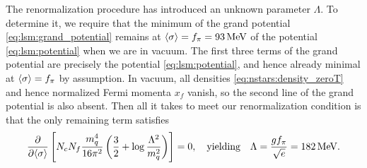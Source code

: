 The renormalization procedure has introduced an unknown parameter $\Lambda$.
To determine it, we require that the minimum of the grand potential \eqref{eq:lsm:grand_potential} remains at $\langle \sigma \rangle = f_\pi = \SI{93}{\mega\electronvolt}$ of the potential \eqref{eq:lsm:potential} when we are in vacuum.
The first three terms of the grand potential are precisely the potential \eqref{eq:lsm:potential}, and hence already minimal at $\langle \sigma \rangle = f_\pi$ by assumption.
In vacuum, all densities \eqref{eq:nstars:density_zeroT} and hence normalized Fermi momenta $x_f$ vanish, so the second line of the grand potential is also absent.
Then all it takes to meet our renormalization condition is that the only remaining term satisfies
\begin{equation}
	\pdv*{\left[ N_c N_f \frac{m_q^4}{16 \pi^2} \left( \frac32 + \log \frac{\Lambda^2}{m_q^2} \right) \right] }{\langle \sigma \rangle} = 0,
	\quad \text{yielding} \quad
	\Lambda = \frac{g f_\pi}{\sqrt{e}} = \SI{182}{\mega\electronvolt}.
\label{eq:lsm:potential_vacuum_minimum}
\end{equation}

